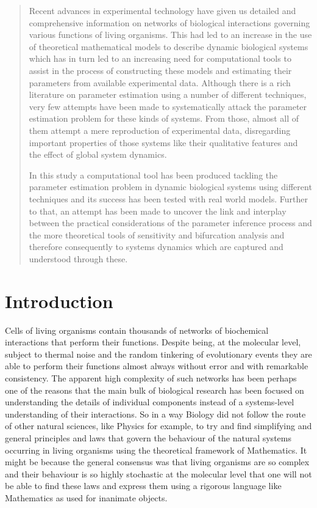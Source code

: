 \documentclass[12pt,a4paper,titlepage]{article}
\begin{document}

\begin{abstract}
\nocite{gelman2003bayesian, Walsh04markovchain, lazebnik2002can}
Recent advances in experimental technology have given us detailed and comprehensive information on networks of biological interactions governing various functions of living organisms. This had led to an increase in the use of theoretical mathematical models to describe dynamic biological systems which has in turn led to an increasing need for computational tools to assist in the process of constructing these models and estimating their parameters from available experimental data. Although there is a rich literature on parameter estimation using a number of different techniques, very few attempts have been made to systematically attack the parameter estimation problem for these kinds of systems. From those, almost all of them attempt a mere reproduction of experimental data, disregarding important properties of those systems like their qualitative features and the effect of global system dynamics. 

In this study a computational tool has been produced tackling the parameter estimation problem in dynamic biological systems using different techniques and its success has been tested with real world models. Further to that, an attempt has been made to uncover the link and interplay between the practical considerations of the parameter inference process and the more theoretical tools of sensitivity and bifurcation analysis and therefore consequently to systems dynamics which are captured and understood through these. 
\end{abstract}
\tableofcontents
\newpage
\section{Introduction}
Cells of living organisms contain thousands of networks of biochemical interactions that perform their functions. Despite being, at the molecular level, subject to thermal noise and the random tinkering of evolutionary events they are able to perform their functions almost always without error and with remarkable consistency. The apparent high complexity of such networks has been perhaps one of the reasons that the main bulk of biological research has been focused on understanding the details of individual components instead of a systems-level understanding of their interactions. So in a way Biology did not follow the route of other natural sciences, like Physics for example, to try and find simplifying and general principles and laws that govern the behaviour of the natural systems occurring in living organisms using the theoretical framework of Mathematics. It might be because the general consensus was that living organisms are so complex and their behaviour is so highly stochastic at the molecular level that one will not be able to find these laws and express them using a rigorous language like Mathematics as used for inanimate objects. 
\end{document}
